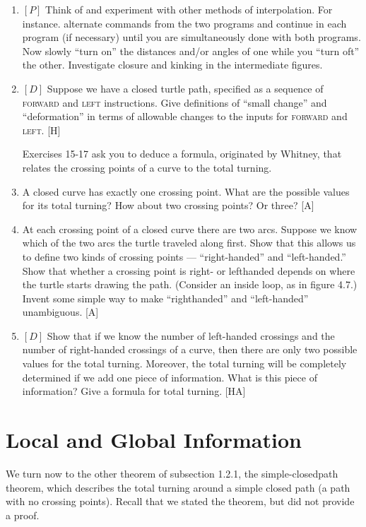 \documentclass{book}
\begin{document}
\begin{enumerate}
\item $[P]$ Think of and experiment with other methods of interpolation.
For instance. alternate commands from the two programs and continue in each program (if necessary) until you are simultaneously done
with both programs. Now slowly ``turn on'' the distances and/or angles
of one while you ``turn oft'' the other. Investigate closure and kinking in
the intermediate figures.
\item $[D]$ Suppose we have a closed turtle path, specified as a sequence of
\textsc{forward} and \textsc{left} instructions. Give definitions of ``small change'' and
``deformation'' in terms of allowable changes to the inputs for \textsc{forward}
and \textsc{left}. [H]

Exercises 15-17 ask you to deduce a formula, originated by Whitney,
that relates the crossing points of a curve to the total turning.

\item A closed curve has exactly one crossing point. What are the possible
values for its total turning? How about two crossing points? Or three?
[A]

\item At each crossing point of a closed curve there are two arcs. Suppose
we know which of the two arcs the turtle traveled along first. Show that
this allows us to define two kinds of crossing points --- ``right-handed''
and ``left-handed.'' Show that whether a crossing point is right- or lefthanded depends on where the turtle starts drawing the path. (Consider
an inside loop, as in figure 4.7.) Invent some simple way to make ``righthanded'' and ``left-handed'' unambiguous. [A]

\item $[D]$ Show that if we know the number of left-handed crossings and
the number of right-handed crossings of a curve, then there are only two
possible values for the total turning. Moreover, the total turning will be
completely determined if we add one piece of information. What is this
piece of information? Give a formula for total turning. [HA]
\end{enumerate}

\section{Local and Global Information}

We turn now to the other theorem of subsection 1.2.1, the simple-closedpath theorem, which describes the total turning around a simple closed
path (a path with no crossing points). Recall that we stated the theorem,
but did not provide a proof.
\end{document}
